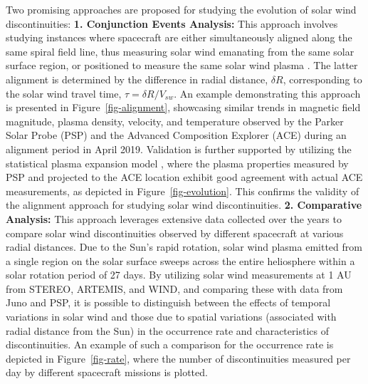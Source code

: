 \documentclass[
  letterpaper,
  DIV=11,
  numbers=noendperiod]{scrartcl}
\begin{document}
Two promising approaches are proposed for studying the evolution of solar wind discontinuities:
\textbf{1. Conjunction Events Analysis:} This approach involves studying instances where spacecraft are either simultaneously aligned along the same spiral field line, thus measuring solar wind emanating from the same solar surface region, or positioned to measure the same solar wind plasma \citep{velliUnderstandingOriginsHeliosphere2020}. The latter alignment is determined by the difference in radial distance, \(\delta R\), corresponding to the solar wind travel time, \(\tau = \delta R / V_{sw}\).
An example demonstrating this approach is presented in Figure~\ref{fig-alignment}, showcasing similar trends in magnetic field magnitude, plasma density, velocity, and temperature observed by the Parker Solar Probe (PSP) and the Advanced Composition Explorer (ACE) during an alignment period in April 2019. Validation is further supported by utilizing the statistical plasma expansion model \citep{perroneRadialEvolutionSolar2019}, where the plasma properties measured by PSP and projected to the ACE location exhibit good agreement with actual ACE measurements, as depicted in Figure~\ref{fig-evolution}. This confirms the validity of the alignment approach for studying solar wind discontinuities.
\textbf{2. Comparative Analysis:} This approach leverages extensive data collected over the years to compare solar wind discontinuities observed by different spacecraft at various radial distances. Due to the Sun's rapid rotation, solar wind plasma emitted from a single region on the solar surface sweeps across the entire heliosphere within a solar rotation period of 27 days. By utilizing solar wind measurements at 1 AU from STEREO, ARTEMIS, and WIND, and comparing these with data from Juno and PSP, it is possible to distinguish between the effects of temporal variations in solar wind and those due to spatial variations (associated with radial distance from the Sun) in the occurrence rate and characteristics of discontinuities. An example of such a comparison for the occurrence rate is depicted in Figure~\ref{fig-rate}, where the number of discontinuities measured per day by different spacecraft missions is plotted.
\end{document}
